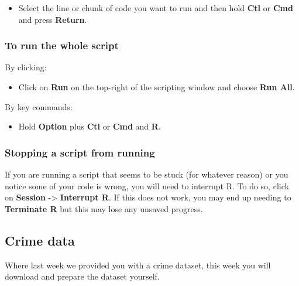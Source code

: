 \documentclass[
]{book}
\providecommand{\tightlist}{%
  \setlength{\itemsep}{0pt}\setlength{\parskip}{0pt}}
\begin{document}
\begin{itemize}
\tightlist
\item
  Select the line or chunk of code you want to run and then hold \textbf{Ctl} or \textbf{Cmd} and press \textbf{Return}.
\end{itemize}

\hypertarget{to-run-the-whole-script}{%
\subsubsection*{To run the whole script}\label{to-run-the-whole-script}}

By clicking:

\begin{itemize}
\tightlist
\item
  Click on \textbf{Run} on the top-right of the scripting window and choose \textbf{Run All}.
\end{itemize}

By key commands:

\begin{itemize}
\tightlist
\item
  Hold \textbf{Option} plus \textbf{Ctl} or \textbf{Cmd} and \textbf{R}.
\end{itemize}

\hypertarget{stopping-a-script-from-running}{%
\subsubsection*{Stopping a script from running}\label{stopping-a-script-from-running}}

If you are running a script that seems to be stuck (for whatever reason) or you notice some of your code is wrong, you will need to interrupt R. To do so, click on \textbf{Session} -\textgreater{} \textbf{Interrupt R}. If this does not work, you may end up needing to \textbf{Terminate R} but this may lose any unsaved progress.

\hypertarget{crime-data-2}{%
\subsection{Crime data}\label{crime-data-2}}

Where last week we provided you with a crime dataset, this week you will download and prepare the dataset yourself.
\end{document}
